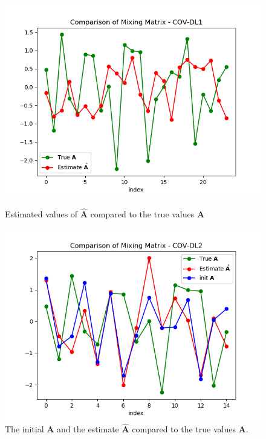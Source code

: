 \begin{figure}[h]
    \begin{minipage}[t]{.45\textwidth}
		\centering
		\includegraphics[scale=0.5]{figures/ch_6/COV1_simple.png}
		\caption{Estimated values of $\hat{\textbf{A}}$ compared to the true 				values $\textbf{A}$}
		\label{fig:cov1_simple}
    \end{minipage} 
    \hfill
    \begin{minipage}[t]{.45\textwidth}
        \centering
		\includegraphics[scale=0.5]{figures/ch_6/COV2_simple.png}
		\caption{The initial $\textbf{A}$ and the estimate $\hat{\textbf{A}}$ 				compared to the true values $\textbf{A}$. }
		\label{fig:cov2_simple}
    \end{minipage}
\end{figure}

